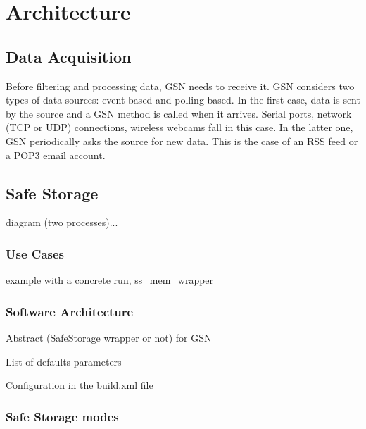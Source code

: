 \graphicspath{{chapters/ch-architecture/figures/}}

\chapter{Architecture}

\section{Data Acquisition}

 Before filtering and processing data, GSN needs to receive it. GSN considers two types of data sources: event-based and polling-based.
 In the first case, data is sent by the source and a GSN method is called when it arrives.
 Serial ports, network (TCP or UDP) connections, wireless webcams fall in this case. In the latter one, GSN periodically asks the 
 source for new data. This is the case of an RSS feed or a POP3 email account.

\section{Safe Storage}




diagram (two processes)...

\subsection{Use Cases}
example with a concrete run, ss\_mem\_wrapper

\subsection{Software Architecture}

Abstract (SafeStorage wrapper or not) for GSN

List of defaults parameters

Configuration in the build.xml file

\subsection{Safe Storage modes}

